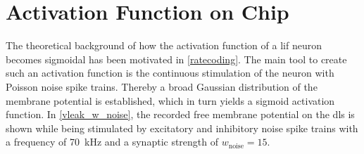 \section{Activation Function on Chip}
The theoretical background of how the activation function of a \gls{lif} neuron becomes sigmoidal has been motivated in \cref{ratecoding}. The main tool to create such an activation function is the continuous stimulation of the neuron with Poisson noise spike trains. Thereby a broad Gaussian distribution of the membrane potential is established, which in turn yields a sigmoid activation function. In \cref{vleak_w_noise}, the recorded free membrane potential on the \gls{dls} is shown while being stimulated by excitatory and inhibitory noise spike trains with a frequency of \SI{70}{\kilo \Hz} and a synaptic strength of $w_\text{noise}= 15$. 

